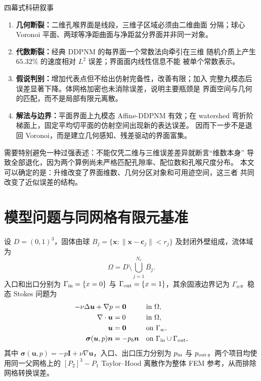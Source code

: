 \documentclass[UTF8,zihao=-4]{ctexart}
\newcommand{\normal}{\bm n}
\newcommand{\stress}{\bm\sigma}
\begin{document}
\begin{keybox}{四幕式科研叙事}
\begin{enumerate}
  \item \textbf{几何断裂：}二维孔喉界面是线段，三维子区域必须由二维曲面
  分隔；球心 Voronoi 平面、两球等净距曲面与净距盆分界面并非同一对象。
  \item \textbf{代数断裂：}经典 DDPNM 的每界面一个常数法向牵引在三维
  随机介质上产生 $65.32\%$ 的速度相对 $L^2$ 误差；界面面内线性信息不能
  被单个常数表示。
  \item \textbf{假说判别：}增加代表点但不给出仿射完备性，改善有限；加入
  完整九模态后误差显著下降。体网格加密也未消除误差，说明主要瓶颈是
  界面空间与几何的匹配，而不是局部有限元离散。
  \item \textbf{解法与边界：}平面界面上九模态 Affine-DDPNM 有效；在
  watershed 弯折阶梯面上，固定平均切平面的仿射空间出现新的表达误差。
  因而下一步不是退回 Voronoi，而是建立几何感知、残差驱动的界面富集。
\end{enumerate}
\end{keybox}

需要特别避免一种过强表述：不能仅凭二维与三维误差差异就断言``维数本身''
导致全部退化，因为两个算例尚未严格匹配孔隙率、配位数和孔喉尺度分布。
本文可以确定的是：升维改变了界面维数、几何分区对象和可用迹空间，这三者
共同改变了近似误差的结构。

\section{模型问题与同网格有限元基准}

设 $D=(0,1)^3$，固体由球
$B_j=\{\bm x:\|\bm x-\bm c_j\|<r_j\}$ 及封闭外壁组成，流体域为
\begin{equation}
  \Omega=D\setminus\bigcup_{j=1}^{N_s}\overline{B_j}.
\end{equation}
入口和出口分别为 $\Gamma_{\rm in}=\{x=0\}$ 与
$\Gamma_{\rm out}=\{x=1\}$，其余固液边界记为 $\Gamma_w$。稳态 Stokes
问题为
\begin{equation}\label{eq:stokes}
\begin{aligned}
 -\nu\Delta\bm u+\nabla p&=\bm0 &&\text{in }\Omega,\\
 \nabla\cdot\bm u&=0 &&\text{in }\Omega,\\
 \bm u&=\bm0 &&\text{on }\Gamma_w,\\
 \stress(\bm u,p)\normal&=-p_b\normal
 &&\text{on }\Gamma_{\rm in}\cup\Gamma_{\rm out},
\end{aligned}
\end{equation}
其中 $\stress(\bm u,p)=-p\bm I+\nu\nabla\bm u$，入口、出口压力分别为
$p_{\rm in}$ 与 $p_{\rm out}$。两个项目均使用同一父网格上的
$[P_2]^3-P_1$ Taylor--Hood 离散作为整体 FEM 参考，从而排除网格转换误差。
\end{document}
